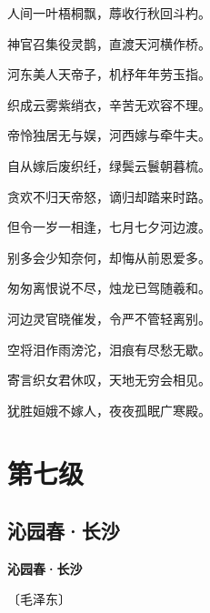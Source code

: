 \documentclass[12pt,UTF-8,openany,fontset=none]{ctexbook}
\begin{document}
    \vspace{18pt}  %

\begin{center}
    \begin{Large}

        人间一叶梧桐飘，蓐收行秋回斗杓。

        神官召集役灵鹊，直渡天河横作桥。

        河东美人天帝子，机杼年年劳玉指。

        织成云雾紫绡衣，辛苦无欢容不理。

        帝怜独居无与娱，河西嫁与牵牛夫。

        自从嫁后废织纴，绿鬓云鬟朝暮梳。

        贪欢不归天帝怒，谪归却踏来时路。

        但令一岁一相逢，七月七夕河边渡。

        别多会少知奈何，却悔从前恩爱多。

        匆匆离恨说不尽，烛龙已驾随羲和。

        河边灵官晓催发，令严不管轻离别。

        空将泪作雨滂沱，泪痕有尽愁无歇。

        寄言织女君休叹，天地无穷会相见。

        犹胜姮娥不嫁人，夜夜孤眠广寒殿。

    \end{Large}

\end{center}

\vspace{8pt}
\clearpage


\chapter{第七级}
\clearpage

\section{沁园春·长沙}


\begin{center}
    {\bfseries 沁园春·长沙}

    \vspace{18pt}

    \begin{large}\xuwen
        〔毛泽东〕
    \end{large}

\end{center}
\end{document}
